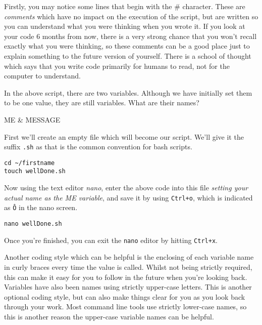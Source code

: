 \begin{information}
Firstly, you may notice some lines that begin with the \# character.
These are \textit{comments} which have no impact on the execution of the script, but are written so you can understand what you were thinking when you wrote it.
If you look at your code 6 months from now, there is a very strong chance that you won't recall exactly what you were thinking, so these comments can be a good place just to explain something to the future version of yourself.
There is a school of thought which says that you write code primarily for humans to read, not for the computer to understand.
\end{information}

\begin{questions}
In the above script, there are two variables. 
Although we have initially set them to be one value, they are still variables.
What are their names? 
\begin{answer}
ME \& MESSAGE
\end{answer}
\end{questions}

\begin{steps}
First we'll create an empty file which will become our script.
We'll give it the suffix \texttt{.sh} as that is the common convention for bash scripts.
\end{steps}
\begin{lstlisting}
cd ~/firstname
touch wellDone.sh
\end{lstlisting}

\begin{steps}
Now using the text editor \textit{nano}, enter the above code into this file \textit{setting your actual name as the ME variable},  and save it by using \texttt{Ctrl+o}, which is indicated as \texttt{\^O} in the nano screen.\\
\end{steps}

\begin{lstlisting}
nano wellDone.sh
\end{lstlisting}

Once you're finished, you can exit the \texttt{nano} editor by hitting \texttt{Ctrl+x}.

\begin{information}

Another coding style which can be helpful is the enclosing of each variable name in curly braces every time the value is called.
Whilst not being strictly required, this can make it easy for you to follow in the future when you're looking back.
Variables have also been names using strictly upper-case letters.
This is another optional coding style, but can also make things clear for you as you look back through your work.
Most command line tools use strictly lower-case names, so this is another reason the upper-case variable names can be helpful.
\end{information}

